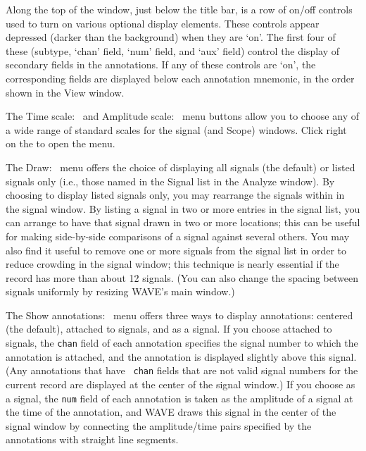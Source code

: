 \documentclass[twoside]{book}
\newcommand{\keycap}[1]{\cornersize{.5}\Ovalbox{\small\sf #1}}
\newcommand{\button}[1]{\cornersize{2}\ovalbox{\rule[-.3mm]{0cm}{2.5mm}\small\sf ~#1~}}
\newcommand{\amenubutton}[1]{{\sf #1}~\keycap{\ensuremath{\nabla}}}
\newcommand{\WAVE}{{\sf WAVE}\xspace}
\begin{document}
Along the top of the window, just below the title bar, is a row of
on/off controls used to turn on various optional display elements.
These controls appear depressed (darker than the background) when they
are `on'.  The first four of these ({\sf subtype}, {\sf `chan' field},
{\sf `num' field}, and {\sf `aux' field}) control the display of
secondary fields in the annotations.  If any of these controls are
`on', the corresponding fields are displayed below each annotation
mnemonic, in the order shown in the {\sf View} window.

The \amenubutton{Time scale:} and \amenubutton{Amplitude scale:}
menu buttons allow you to choose any of a wide range of standard
scales for the signal (and {\sf Scope}) windows.  Click right on
the \button{$\nabla$} to open the menu.

The \amenubutton{Draw:} menu offers the choice of displaying {\sf all
signals} (the default) or {\sf listed signals only} (i.e., those named
in the {\sf Signal list} in the {\sf Analyze} window).  By choosing to
display {\sf listed signals only}, you may rearrange the signals
within in the signal window.  By listing a signal in two or more
entries in the signal list, you can arrange to have that signal drawn
in two or more locations;  this can be useful for making side-by-side
comparisons of a signal against several others.  You may also find
it useful to remove one or more signals from the signal list in order
to reduce crowding in the signal window;  this technique is nearly essential
if the record has more than about 12 signals.  (You can also change
the spacing between signals uniformly by resizing \WAVE{}'s main window.)

The \amenubutton{Show annotations:} menu offers three ways to display
annotations: {\sf centered} (the default),  {\sf attached to signals},
and {\sf as a signal}.  If you choose {\sf attached to signals}, the
{\tt chan} field of each annotation specifies the signal number to
which the annotation is attached, and the annotation is displayed
slightly above this signal.  (Any annotations that have {\tt
chan} fields that are not valid signal numbers for the current record
are displayed at the center of the signal window.)  If you choose {\sf
as a signal}, the {\tt num} field of each annotation is taken as the
amplitude of a signal at the time of the annotation, and \WAVE{} draws
this signal in the center of the signal window by connecting the
amplitude/time pairs specified by the annotations with straight line
segments.
\end{document}
